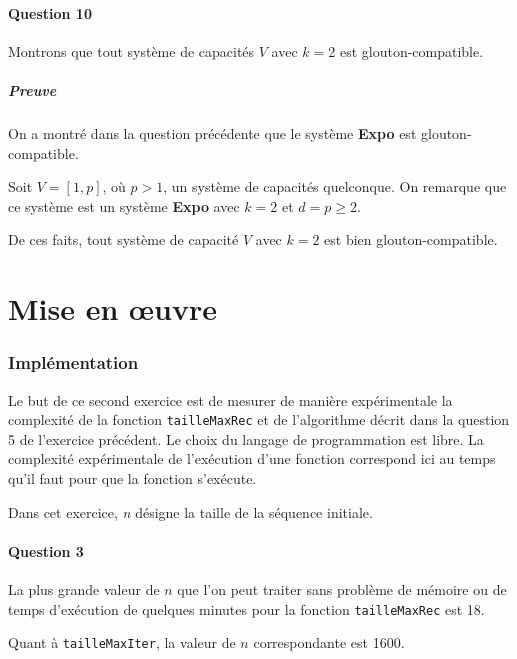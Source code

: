 \documentclass[12pt,a4paper]{article}
\begin{document}
\subsection*{Question 10}
 Montrons que tout syst\`eme de capacit\'es $V$ avec $k = 2$ est glouton-compatible.

 \subsubsection*{Preuve}
 On a montr\'e dans la question pr\'ec\'edente que le syst\`eme {\bfseries Expo} est glouton-compatible.

 Soit $V = [1, p]$, o\`u $p > 1$, un syst\`eme de capacit\'es quelconque. On remarque que ce syst\`eme est un syst\`eme {\bfseries Expo} avec $k = 2$ et $d = p \geq 2$.

 De ces faits, tout syst\`eme de capacit\'e $V$ avec $k = 2$ est bien glouton-compatible.

\newpage
\part{Mise en \oe uvre}

\section{Impl\'ementation}
Le but de ce second exercice est de mesurer de mani\`ere exp\'erimentale la complexit\'e de la fonction \texttt{tailleMaxRec} et de l'algorithme d\'ecrit dans la question 5 de l'exercice pr\'ec\'edent. Le choix du langage de programmation est libre. La complexit\'e exp\'erimentale de l'ex\'ecution d'une fonction correspond ici au temps qu'il faut pour que la fonction s'ex\'ecute.

Dans cet exercice, {\itshape n} d\'esigne la taille de la s\'equence initiale.

\subsection*{Question 3}
La plus grande valeur de $n$ que l'on peut traiter sans probl\`eme de m\'emoire ou de temps d'ex\'ecution de quelques minutes pour la fonction \texttt{tailleMaxRec} est 18. 

Quant \`a \texttt{tailleMaxIter}, la valeur de $n$ correspondante est 1600.
\end{document}
